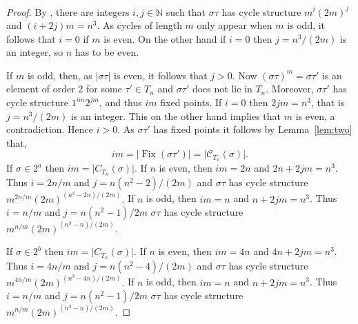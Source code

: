 \documentclass[12pt]{article}
\theoremstyle{definition}
\theoremstyle{remark}
\newcommand{\N}{{\mathbb{N}}}
\DeclareMathOperator{\Fix}{Fix}
\newcommand{\C}{{\mathcal{C}}}
\begin{document}
\begin{proof}

By , there are integers $i,j\in \N$ such that $\sigma\tau$
has cycle structure $m^{i}(2m)^j$ and $(i+2j)m = n^3.$
As cycles of length $m$ only appear when $m$ is odd, it follows that $i=0$ if $m$ is even. On the other hand if $i=0$ then $j=n^3/(2m)$ is an integer, so $n$ has to be even.

If $m$ is odd, then,
as $\vert \sigma\tau\vert $ is even,
it follows that $j>0.$
Now $(\sigma\tau)^m = \sigma\tau'$ is an element of order $2$
 for some $\tau'\in T_n$
 and $\sigma\tau'$ does not lie in $T_n.$
Moreover, $\sigma\tau'$ has cycle structure $1^{im}2^{jm}$, and thus $im$ fixed points.
If $i = 0$ then $2jm=n^3$, that is $j = n^3/(2m)$ is an integer. This on the other hand implies that $m$ is even, a contradiction. Hence $i > 0.$
As $\sigma\tau'$ has fixed points it follows by Lemma~\ref{lem:two} that,
 \[im=\vert \Fix(\sigma\tau')\vert = \vert \C_{T_n}(\sigma)\vert .\]
 If $\sigma\in 2^a$ then
 $im = \vert C_{T_n}(\sigma)\vert $.
 If $n$ is even, then $im = 2n$
 and $2n + 2jm = n^3$. Thus
 $i=2n/m$
 and  $j=n(n^2-2)/(2m)$ and
 $\sigma\tau$ has cycle structure $m^{2n/m}(2m)^{(n^3-2n)/(2m)}.$
 If $n$ is odd, then $im = n$
 and $n + 2jm = n^3$. Thus
 $i =n/m$ and $j= n(n^2-1)/2m $
$\sigma\tau$ has cycle structure $m^{n/m}(2m)^{(n^3-n)/(2m)}.$

 If $\sigma\in 2^b$ then
 $im = \vert C_{T_n}(\sigma)\vert $.
 If $n$ is even, then $im = 4n$
 and $4n + 2jm = n^3$. Thus
 $i=4n/m$
 and  $j=n(n^2-4)/(2m)$ and
 $\sigma\tau$ has cycle structure $m^{4n/m}(2m)^{(n^3-4n)/(2m)}.$
 If $n$ is odd, then $im = n$
 and $n + 2jm = n^3$. Thus
 $i =n/m$ and $j= n(n^2-1)/2m $
$\sigma\tau$ has cycle structure $m^{n/m}(2m)^{(n^3-n)/(2m)}.$
\end{proof}
\end{document}
